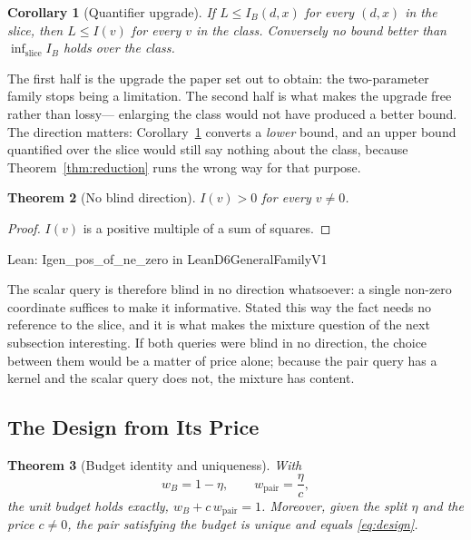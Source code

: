 \documentclass[conference]{IEEEtran}
\newtheorem{theorem}{Theorem}
\newtheorem{corollary}[theorem]{Corollary}
\theoremstyle{definition}
\newcommand{\lean}[1]{\textsf{\footnotesize #1}}
\newcommand{\leanbox}[1]{%
  \par\vspace{2pt}\noindent
  {\footnotesize\textsf{Lean: #1}}\par\vspace{2pt}}
\begin{document}
\begin{corollary}[Quantifier upgrade]
\label{cor:upgrade}
If $L\le I_{B}(d,x)$ for every $(d,x)$ in the slice, then $L\le I(v)$ for every $v$ in the
class. Conversely no bound better than $\inf_{\text{slice}}I_{B}$ holds over the class.
\end{corollary}

The first half is the upgrade the paper set out to obtain: the two-parameter family stops
being a limitation. The second half is what makes the upgrade free rather than lossy---
enlarging the class would not have produced a better bound. The direction matters:
Corollary~\ref{cor:upgrade} converts a \emph{lower} bound, and an upper bound quantified over
the slice would still say nothing about the class, because Theorem~\ref{thm:reduction} runs
the wrong way for that purpose.

\begin{theorem}[No blind direction]
\label{thm:nonblind}
$I(v)>0$ for every $v\neq0$.
\end{theorem}

\begin{proof}
$I(v)$ is a positive multiple of a sum of squares.
\end{proof}

\leanbox{\lean{Igen\_pos\_of\_ne\_zero} in \lean{LeanD6GeneralFamilyV1}}

The scalar query is therefore blind in no direction whatsoever: a single non-zero coordinate
suffices to make it informative. Stated this way the fact needs no reference to the slice, and
it is what makes the mixture question of the next subsection interesting. If both queries were
blind in no direction, the choice between them would be a matter of price alone; because the
pair query has a kernel and the scalar query does not, the mixture has content.

\subsection{The Design from Its Price}
\label{sec:design}

\begin{theorem}[Budget identity and uniqueness]
\label{thm:unique}
With
\begin{equation}
w_{B}=1-\eta,\qquad
w_{\mathrm{pair}}=\frac{\eta}{c},
\label{eq:design}
\end{equation}
the unit budget holds exactly, $w_{B}+c\,w_{\mathrm{pair}}=1$. Moreover, given the split
$\eta$ and the price $c\neq0$, the pair satisfying the budget is unique and equals
\eqref{eq:design}.
\end{theorem}
\end{document}
